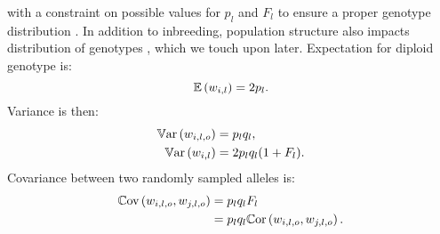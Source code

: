 %
with a constraint on possible values for $p_l$ and $F_l$ to ensure
a proper genotype distribution \citep{bahadur1961representation}.
%
In addition to inbreeding, population structure also impacts distribution
of genotypes \citep{wahlund1928zusammensetzung}, which we touch upon later.
%
Expectation for diploid genotype is:
%
\begin{equation} \label{eqn:geno_exp}
  \mathbb{E}\left(w_{i,l}\right) = 2p_l.
\end{equation}
%
%
%
Variance is then:
%
\begin{align} \label{eqn:geno_var}
  \mathbb{V}\text{ar}\left(w_{i,l,o}\right) & = p_l q_l,\\
  \mathbb{V}\text{ar}\left(w_{i,l}\right)   & = 2 p_l q_l (1 + F_l). \notag
\end{align} 
%
%
Covariance between two randomly sampled alleles is:
%
\begin{align} \label{eqn:allele_cov}
  \Cov\left(w_{i,l,o}, w_{j,l,o}\right) & = p_l q_l F_l \\
%
                                        & = p_l q_l \Cor\left(w_{i,l,o}, w_{j,l,o}\right). \notag
\end{align}

